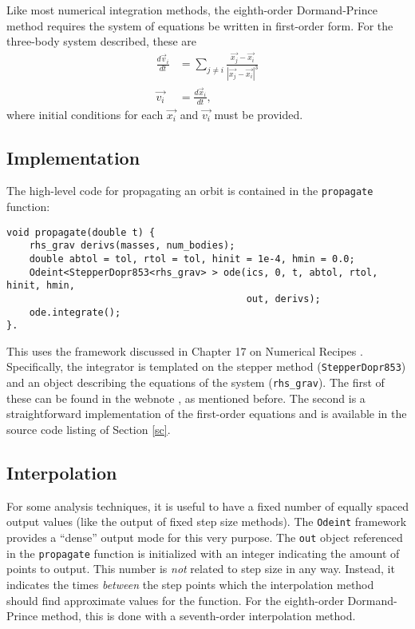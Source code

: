\documentclass[12pt]{article}
\begin{document}
Like most numerical integration methods, the eighth-order Dormand-Prince method requires the system of equations be written in first-order form. For the three-body system described, these are
\begin{align*}
\frac{d\vec{v}_i}{dt} &= \sum_{j \neq i} \frac{\vec{x_j}-\vec{x_i}}{|\vec{x_j}-\vec{x_i}|^3} \\
\vec{v_i} &= \frac{d\vec{x}_i}{dt},
\end{align*}
where initial conditions for each $\vec{x_i}$ and $\vec{v_i}$ must be provided.
\subsection{Implementation}
The high-level code for propagating an orbit is contained in the \texttt{propagate} function:
\begin{lstlisting}
void propagate(double t) {
    rhs_grav derivs(masses, num_bodies);
    double abtol = tol, rtol = tol, hinit = 1e-4, hmin = 0.0;
    Odeint<StepperDopr853<rhs_grav> > ode(ics, 0, t, abtol, rtol, hinit, hmin,
                                          out, derivs);
    ode.integrate();
}.
\end{lstlisting}
This uses the framework discussed in Chapter 17 on Numerical Recipes \cite{numericalrecipes}. Specifically, the integrator is templated on the stepper method (\texttt{StepperDopr853}) and an object describing the equations of the system (\texttt{rhs\_grav}). The first of these can be found in the webnote \cite{nrwebnote}, as mentioned before. The second is a straightforward implementation of the first-order equations and is available in the source code listing of Section \ref{sc}.
\subsection{Interpolation}
For some analysis techniques, it is useful to have a fixed number of equally spaced output values (like the output of fixed step size methods). The \texttt{Odeint} framework provides a ``dense'' output mode for this very purpose. The \texttt{out} object referenced in the \texttt{propagate} function is initialized with an integer indicating the amount of points to output. This number is \emph{not} related to step size in any way. Instead, it indicates the times \emph{between} the step points which the interpolation method should find approximate values for the function. For the eighth-order Dormand-Prince method, this is done with a seventh-order interpolation method. \\
\end{document}

